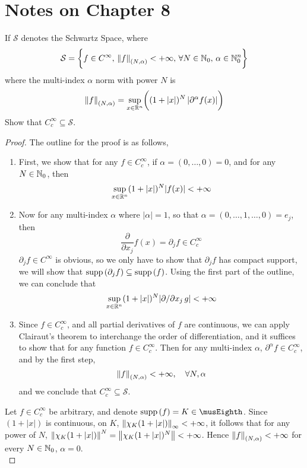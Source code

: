 \documentclass[../../main.tex]{subfiles}
\begin{document}
\providecommand{\szz}{\mathcal{S}}
\providecommand{\ccinf}{C_c^\infty}
\section*{Notes on Chapter 8}
\begin{wts}
    If $\szz$ denotes the Schwartz Space, where
    \[
    \szz = \biggl\{f\in C^\infty,\, \norm{f}_{(N,\alpha)}<+\infty,\,\forall N\in\nat_0,\,\alpha\in\nat_0^n\biggr\}
    \]
    where the multi-index $\alpha$ norm with power $N$ is 
    \[
    \norm{f}_{(N,\alpha)}=\sup_{x\in\mathbb{R}^n}\biggl((1+|x|)^N\left|\partial^\alpha f(x)\right|\biggr)
    \]
    Show that $\ccinf\subseteq \szz$.
\end{wts}
\begin{proof}
    The outline for the proof is as follows,
    \begin{enumerate}
        \item First, we show that for any $f\in\ccinf$, if $\alpha = (0,\ldots,0)=0$, and for any $N\in\mathbb{N}_0$, then 
        \[
        \sup_{x\in\mathbb{R}^n}(1+|x|)^N|f(x)|<+\infty
        \]
        \item Now for any multi-index $\alpha$ where $|\alpha| = 1$, so that $\alpha = (0,\ldots,1,\ldots,0)=e_j$, then 
        \[
        \dfrac{\partial}{\partial x_j}f(x)=\partial_j f\in \ccinf
        \]
        $\partial_j f\in C^\infty$ is obvious, so we only have to show that $\partial_j f$ has compact support, we will show that $\operatorname{supp}{(\partial_j f)}\subseteq \operatorname{supp}{(f)}$. Using the first part of the outline, we can conclude that
        \[
        \sup_{x\in\mathbb{R}^n}(1+|x|)^N|\partial/\partial x_j\, g|<+\infty
        \]
        \item Since $f\in\ccinf$, and all partial derivatives of $f$ are continuous, we can apply Clairaut's theorem to interchange the order of differentiation, and it suffices to show that for any function $f\in \ccinf$. Then for any multi-index $\alpha$, $\partial^\alpha f\in\ccinf$, and by the first step,
        \[
        \norm{f}_{(N,\alpha)}<+\infty,\quad\forall N,\alpha
        \]
        and we conclude that $\ccinf\subseteq \szz$.
    \end{enumerate}
    Let $f\in\ccinf$ be arbitrary, and denote $\supp{f}=K\in\cpt$. Since $(1+|x|)$ is continuous, on $K$, $\norm{\chi_K(1+|x|)}_\infty<+\infty$, it follows that for any power of $N$, $\norm{\chi_K(1+|x|)}^N=\norm{\chi_K(1+|x|)^N}<+\infty$. Hence $\norm{f}_{(N,\alpha)}<+\infty$ for every $N\in\mathbb{N}_0$, $\alpha=0$.\\
    

\end{proof}
\end{document}
